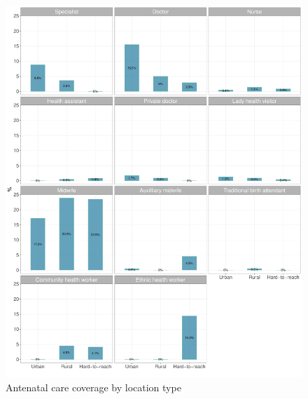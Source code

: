\documentclass[12pt,a4paper]{article}
\begin{document}
\begin{figure}[H]

{\centering \includegraphics{kayahReport_files/figure-latex/anc1plot-1} 

}

\caption{Antenatal care coverage by location type}\label{fig:anc1plot}
\end{figure}
\end{document}
